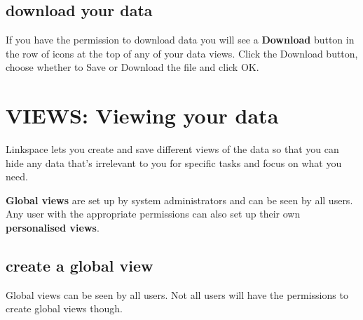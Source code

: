 \documentclass{ctrlo-int-toc}
\begin{document}
\subsection[download your data]{download your data}
If you have the permission to download data you will see a \textbf{Download} button in the row of icons at the top of any of your data views. Click the Download button, choose whether to Save or Download the file and click OK. 

\clearpage\section[VIEWS: Viewing your data]{VIEWS: Viewing your data}
\label{sec:views}
Linkspace lets you create and save different views of the data so that you can hide any data that's irrelevant to you for specific tasks and focus on what you need.

\textbf{Global views} are set up by system administrators and can be seen by all users. Any user with the appropriate permissions can also set up their own \textbf{personalised views}.

\subsection[create a global view]{create a global view}
\label{subsec:globalview}
Global views can be seen by all users. Not all users will have the permissions to create global views though.
\end{document}
